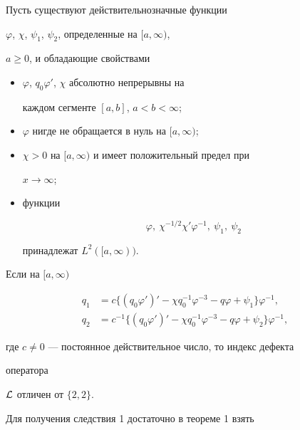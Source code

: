 \begin{cor} 


Пусть существуют действительнозначные функции 


$\varphi$, $\chi$, $\psi_1$, $\psi_2$, определенные на $[a,\infty)$, 


$a\ge0$, и обладающие свойствами 


\begin{itemize} 


\item[1)] $\varphi$, $q_0\varphi'$, $\chi$ абсолютно непрерывны на 


каждом сегменте $[a,b]$, $a<b<\infty$; 


\item[2)] $\varphi$ нигде не обращается в нуль на $[a,\infty)$; 


\item[3)] $\chi>0$ на $[a,\infty)$ и имеет положительный предел при 


$x\to\infty$; 


\item[4)] функции 


$$ 


\varphi,\ \chi^{-1/2}\chi'\varphi^{-1},\ \psi_1,\ \psi_2 


$$ 


принадлежат $L^2([a,\infty))$. 


\end{itemize} 


Если на $[a,\infty)$ 


\begin{align*} 


q_1&=c\{(q_0\varphi')'-\chi q^{-1}_0\varphi^{-3}- 


q\varphi+\psi_1\}\varphi^{-1},\\ 


q_2&=c^{-1}\{(q_0\varphi')'-\chi q^{-1}_0\varphi^{-3}- 


q\varphi+\psi_2\}\varphi^{-1}, 


\end{align*} 


где $c\ne0$ --- постоянное действительное число, то индекс дефекта 


оператора 


$\cal L$ отличен от $\{2,2\}$. 


\end{cor} 


 


Для получения следствия 1 достаточно в теореме 1 взять 


